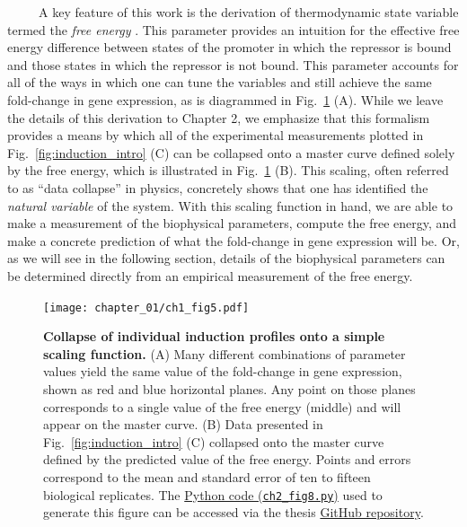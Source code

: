 \documentclass[12pt]{caltech_thesis}
\begin{document}
~~~~~A key feature of this work is the derivation of thermodynamic state
variable termed the \emph{free energy} \autocite{keymer2006,swem2008}.
This parameter provides an intuition for the effective free energy
difference between states of the promoter in which the repressor is
bound and those states in which the repressor is not bound. This
parameter accounts for all of the ways in which one can tune the
variables and still achieve the same fold-change in gene expression, as
is diagrammed in Fig.~\ref{fig:collapse_intro} (A). While we leave the
details of this derivation to Chapter 2, we emphasize that this
formalism provides a means by which all of the experimental measurements
plotted in Fig.~\ref{fig:induction_intro} (C) can be collapsed onto a
master curve defined solely by the free energy, which is illustrated in
Fig.~\ref{fig:collapse_intro} (B). This scaling, often referred to as
``data collapse'' in physics, concretely shows that one has identified
the \emph{natural variable} of the system. With this scaling function in
hand, we are able to make a measurement of the biophysical parameters,
compute the free energy, and make a concrete prediction of what the
fold-change in gene expression will be. Or, as we will see in the
following section, details of the biophysical parameters can be
determined directly from an empirical measurement of the free energy.

\hypertarget{fig:collapse_intro}{%
\begin{figure}
\centering
\texttt{[image: chapter\_01/ch1\_fig5.pdf]}
\caption[{Collapse of individual induction profiles onto a simple
scaling function.}]{\textbf{Collapse of individual induction profiles
onto a simple scaling function.} (A) Many different combinations of
parameter values yield the same value of the fold-change in gene
expression, shown as red and blue horizontal planes. Any point on those
planes corresponds to a single value of the free energy (middle) and
will appear on the master curve. (B) Data presented in
Fig.~\ref{fig:induction_intro} (C) collapsed onto the master curve
defined by the predicted value of the free energy. Points and errors
correspond to the mean and standard error of ten to fifteen biological
replicates. The
\href{https://github.com/gchure/phd/blob/master/src/chapter_02/code/ch2_fig8.py}{Python
code (\texttt{ch2\_fig8.py})} used to generate this figure can be
accessed via the thesis \href{https://github.com/gchure/phd}{GitHub
repository}.}
\label{fig:collapse_intro}
\end{figure}
}
\end{document}
